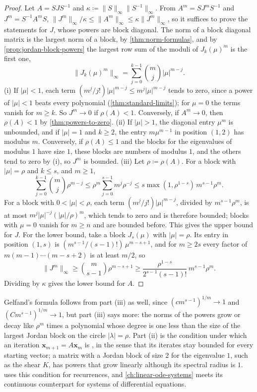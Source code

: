 \begin{proof}
Let $A=SJS^{-1}$ and $\kappa\coloneqq\|S\|_\infty\|S^{-1}\|_\infty$. From $A^m=SJ^mS^{-1}$ and $J^m=S^{-1}A^mS$, $\|J^m\|_\infty/\kappa\le\|A^m\|_\infty\le\kappa\|J^m\|_\infty$, so it suffices to prove the statements for $J$, whose powers are block diagonal. The norm of a block diagonal matrix is the largest norm of a block, by \cref{thm:norm-formulas}, and by \cref{prop:jordan-block-powers} the largest row sum of the moduli of $J_k(\mu)^m$ is the first one,
\[
\|J_k(\mu)^m\|_\infty=\sum_{j=0}^{k-1}\binom mj|\mu|^{m-j}.
\]
(i) If $|\mu|<1$, each term $(m^{\underline j}/j!)|\mu|^{m-j}\le m^j|\mu|^{m-j}$ tends to zero, since a power of $|\mu|<1$ beats every polynomial (\cref{thm:standard-limits}); for $\mu=0$ the terms vanish for $m\ge k$. So $J^m\to0$ if $\rho(A)<1$. Conversely, if $A^m\to0$, then $\rho(A)<1$ by \cref{thm:powers-to-zero}. (ii) If $|\mu|>1$, the diagonal entry $\mu^m$ is unbounded, and if $|\mu|=1$ and $k\ge2$, the entry $m\mu^{m-1}$ in position $(1,2)$ has modulus $m$. Conversely, if $\rho(A)\le1$ and the blocks for the eigenvalues of modulus $1$ have size $1$, these blocks are numbers of modulus $1$, and the others tend to zero by (i), so $J^m$ is bounded. (iii) Let $\rho\coloneqq\rho(A)$. For a block with $|\mu|=\rho$ and $k\le s$, and $m\ge1$,
\[
\sum_{j=0}^{k-1}\binom mj\rho^{m-j}\le\rho^m\sum_{j=0}^{s-1}m^j\rho^{-j}\le s\max(1,\rho^{1-s})\,m^{s-1}\rho^m .
\]
For a block with $0<|\mu|<\rho$, each term $(m^{\underline j}/j!)|\mu|^{m-j}$, divided by $m^{s-1}\rho^m$, is at most $m^{j}|\mu|^{-j}(|\mu|/\rho)^m$, which tends to zero and is therefore bounded; blocks with $\mu=0$ vanish for $m\ge n$ and are bounded before. This gives the upper bound for $J$. For the lower bound, take a block $J_s(\mu)$ with $|\mu|=\rho$. Its entry in position $(1,s)$ is $(m^{\underline{s-1}}/(s-1)!)\,\mu^{m-s+1}$, and for $m\ge2s$ every factor of $m(m-1)\cdots(m-s+2)$ is at least $m/2$, so
\[
\|J^m\|_\infty\ge\binom m{s-1}\rho^{m-s+1}\ge\frac{\rho^{1-s}}{2^{s-1}(s-1)!}\,m^{s-1}\rho^m .
\]
Dividing by $\kappa$ gives the lower bound for $A$.
\end{proof}

Gelfand's formula follows from part (iii) as well, since $(cm^{s-1})^{1/m}\to1$ and $(Cm^{s-1})^{1/m}\to1$, but part (iii) says more: the norms of the powers grow or decay like $\rho^m$ times a polynomial whose degree is one less than the size of the largest Jordan block on the circle $|\lambda|=\rho$. Part (ii) is the condition under which an iteration $\mathbf x_{m+1}=A\mathbf x_m$ is , in the sense that its iterates stay bounded for every starting vector; a matrix with a Jordan block of size $2$ for the eigenvalue $1$, such as the shear $K$, has powers that grow linearly although its spectral radius is $1$.  uses this condition for recurrences, and \cref{ch:linear-ode-systems} meets its continuous counterpart for systems of differential equations.

